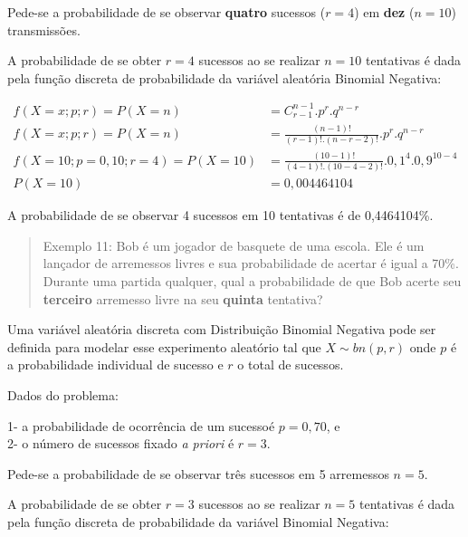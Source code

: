 \documentclass[
]{book}
\begin{document}
\hfill\break

Pede-se a probabilidade de se observar \textbf{quatro} sucessos (\(r=4\)) em \textbf{dez} (\(n=10\)) transmissões.

\hfill\break

A probabilidade de se obter \(r=4\) sucessos ao se realizar \(n=10\) tentativas é dada pela função discreta de probabilidade da variável aleatória Binomial Negativa:

\begin{align*}
f(X=x; p; r) = P(X=n) & = {C}_{r-1}^{n-1} . {p}^{r}. {q}^{n-r} \\
f(X=x; p; r) = P(X=n) & = \frac{(n-1)!}{ (r-1)!. (n-r-2)!} . {p}^{r}. {q}^{n-r} \\ 
f(X=10; p=0,10 ; r=4) = P(X=10) & = \frac{(10-1)!}{ (4-1)!. (10-4-2)!} . {0,1}^{4}. {0,9}^{10-4} \\
P(X=10) & = 0,004464104
\end{align*}

A probabilidade de se observar 4 sucessos em 10 tentativas é de 0,4464104\%.

\hfill\break

\begin{quote}
Exemplo 11: Bob é um jogador de basquete de uma escola. Ele é um lançador de arremessos livres e sua probabilidade de acertar é igual a 70\%. Durante uma partida qualquer, qual a probabilidade de que Bob acerte seu \textbf{terceiro} arremesso livre na seu \textbf{quinta} tentativa?
\end{quote}

\hfill\break

Uma variável aleatória discreta com Distribuição Binomial Negativa pode ser definida para modelar esse experimento aleatório tal que \(X\sim bn(p,r)\) onde \(p\) é a probabilidade individual de sucesso e \(r\) o total de sucessos.

\hfill\break

Dados do problema:

\hfill\break

1- a probabilidade de ocorrência de um sucessoé \(p=0,70\), e\\
2- o número de sucessos fixado \emph{a priori} é \(r=3\).

\hfill\break

Pede-se a probabilidade de se observar três sucessos em 5 arremessos \(n=5\).

\hfill\break

A probabilidade de se obter \(r=3\) sucessos ao se realizar \(n=5\) tentativas é dada pela função discreta de probabilidade da variável Binomial Negativa:
\end{document}
